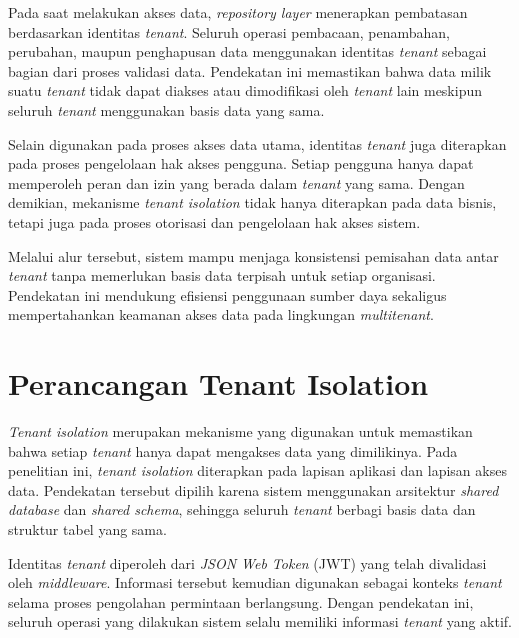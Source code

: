 Pada saat melakukan akses data, \textit{repository layer} menerapkan pembatasan berdasarkan identitas \textit{tenant}. Seluruh operasi pembacaan, penambahan, perubahan, maupun penghapusan data menggunakan identitas \textit{tenant} sebagai bagian dari proses validasi data. Pendekatan ini memastikan bahwa data milik suatu \textit{tenant} tidak dapat diakses atau dimodifikasi oleh \textit{tenant} lain meskipun seluruh \textit{tenant} menggunakan basis data yang sama.

Selain digunakan pada proses akses data utama, identitas \textit{tenant} juga diterapkan pada proses pengelolaan hak akses pengguna. Setiap pengguna hanya dapat memperoleh peran dan izin yang berada dalam \textit{tenant} yang sama. Dengan demikian, mekanisme \textit{tenant isolation} tidak hanya diterapkan pada data bisnis, tetapi juga pada proses otorisasi dan pengelolaan hak akses sistem.

Melalui alur tersebut, sistem mampu menjaga konsistensi pemisahan data antar \textit{tenant} tanpa memerlukan basis data terpisah untuk setiap organisasi. Pendekatan ini mendukung efisiensi penggunaan sumber daya sekaligus mempertahankan keamanan akses data pada lingkungan \textit{multitenant}.

\section{Perancangan Tenant Isolation}

\textit{Tenant isolation} merupakan mekanisme yang digunakan untuk memastikan bahwa setiap \textit{tenant} hanya dapat mengakses data yang dimilikinya. Pada penelitian ini, \textit{tenant isolation} diterapkan pada lapisan aplikasi dan lapisan akses data. Pendekatan tersebut dipilih karena sistem menggunakan arsitektur \textit{shared database} dan \textit{shared schema}, sehingga seluruh \textit{tenant} berbagi basis data dan struktur tabel yang sama.

Identitas \textit{tenant} diperoleh dari \textit{JSON Web Token} (JWT) yang telah divalidasi oleh \textit{middleware}. Informasi tersebut kemudian digunakan sebagai konteks \textit{tenant} selama proses pengolahan permintaan berlangsung. Dengan pendekatan ini, seluruh operasi yang dilakukan sistem selalu memiliki informasi \textit{tenant} yang aktif.

